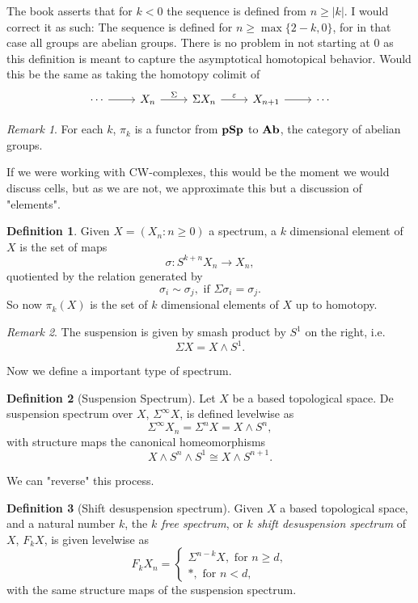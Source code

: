 \documentclass[a4paper,english,11pt]{article}
\theoremstyle{definition}
\newtheorem{Def}{Definition}
\theoremstyle{plain}
\theoremstyle{remark}
\newtheorem{rem}{\color{red}Remark}
\newcommand{\pSp}{\textbf{\text{pSp}}}
\newcommand{\Ab}{\textbf{\text{Ab}}}
\newcommand{\Susp}{\Sigma^{\infty}}
\newcommand{\struc}{\varepsilon}
\begin{document}
The book asserts that for \(k<0\) the sequence is defined from \(n\geq|k|\). I would correct it as such: 
{\color{purple} The sequence is defined for \(n\geq \max\{2-k,0\}\), for in that case all groups are abelian groups}. 
There is no problem in not starting at \(0\) as this definition is meant to capture the asymptotical homotopical behavior. Would this be the same as taking the homotopy colimit of
\begin{equation}
  \label{hip1}
  \begin{tikzcd}
    \cdots\arrow{r}& X_n \arrow{r}{\Sigma}&\Sigma X_n\arrow{r}{\struc}&X_{n+1}\arrow{r}&\cdots
  \end{tikzcd}
\end{equation}
\begin{rem}
  For each \(k\), \(\pi_k\) is a functor from \(\pSp\) to \(\Ab\), the category of abelian groups.
\end{rem} 
If we were working with CW-complexes, this would be the moment we would discuss cells, but as we are not, we approximate this but a discussion of "elements".
\begin{Def}
  Given \(X=(X_n:n\geq 0)\) a spectrum, a \(k\) dimensional element of \(X\) is the set of maps
  \[\sigma:S^{k+n}X_n\to X_n,\]
  quotiented by the relation generated by
  \[\sigma_i\sim\sigma_j, \text{ if } \Sigma\sigma_i=\sigma_j.\]
  So now \(\pi_k(X)\) is the set of \(k\) dimensional elements of \(X\) up to homotopy.
\end{Def}  
\begin{rem}
  The suspension is given by smash product by \(S^1\) {\color{red} on the right}, i.e.
  \[\Sigma X=X\wedge S^1.\]
\end{rem}
Now we define a important type of spectrum.
\begin{Def}[Suspension Spectrum]
  Let \(X\) be a based topological space. De suspension spectrum over \(X\), \(\Susp X\), is defined levelwise as 
  \[\Susp X_n=\Sigma^{n}X=X\wedge S^n,\]
  with structure maps the canonical homeomorphisms
  \[X\wedge S^n\wedge S^1 \cong X\wedge S^{n+1}.\]
\end{Def}
We can "reverse" this process.
\begin{Def}[Shift desuspension spectrum]
  Given \(X\) a based topological space, and a natural number \(k\), the \textit{ \(k\) free spectrum}, or \textit{\(k\) shift desuspension spectrum} of \(X\), \(F_k X\), is given levelwise as
  \[F_kX_n=\begin{cases}
    \Sigma^{n-k}X,\text{ for }n\geq d,\\
    \ast,\text{ for } n<d,
  \end{cases}\]
  with the same structure maps of the suspension spectrum. 
\end{Def}  
\end{document}
